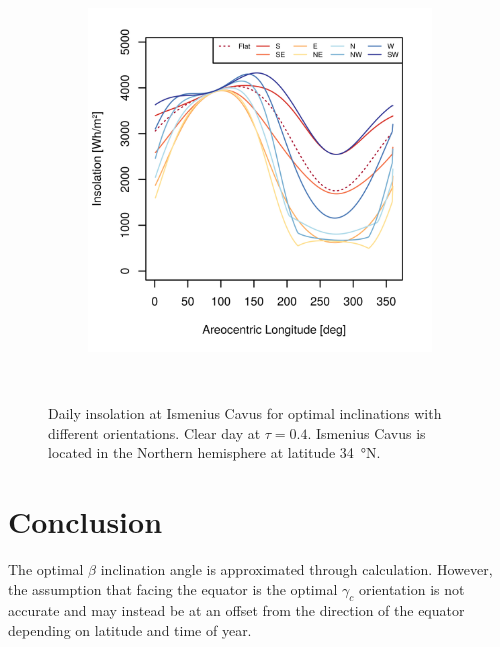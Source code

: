 \begin{figure}[h]
\begin{subfigure}[t]{\subfigureWidth}
            \includegraphics[height=\graphicsHeight]{sections/appendix/optimal-angles/plots/ismenius-cavus-tau-04-and-beta-optimal-based-on-solar-insolation.png}
            \label{fig:sub:optimal-angles-ismenius-cavus-based-on-insolation}
    \end{subfigure}\\[0.8ex]
    \caption[Daily insolation at Ismenius Cavus for optimal inclinations with different orientations]
    {Daily insolation at Ismenius Cavus for optimal inclinations with different orientations. Clear day at $\tau=0.4$. Ismenius Cavus is located in the Northern hemisphere at latitude \SI{34}{\degree}N.}
    \label{fig:plot:optimal-angles-ismenius-cavus}
\vspace{-2ex}
\end{figure}

\section{Conclusion}
The optimal $\beta$ inclination angle is approximated through calculation. However, the assumption that facing the equator is the optimal $\gamma_c$ orientation is not accurate and may instead be at an offset from the direction of the equator depending on latitude and time of year.
